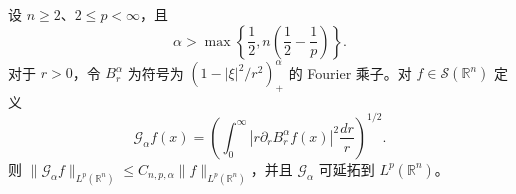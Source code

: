 设 $n\ge2$、$2\le p<\infty$，且
\[
\alpha>\max\left\{\frac12,n\left(\frac12-\frac1p\right)\right\}.
\]
对于 $r>0$，令 $B_r^\alpha$ 为符号为 $(1-|\xi|^2/r^2)_+^\alpha$ 的 Fourier 乘子。对 $f\in\mathcal S(\mathbb R^n)$ 定义
\[
\mathcal G_\alpha f(x)
 =\left(\int_0^\infty |r\partial_r B_r^\alpha f(x)|^2\frac{dr}{r}\right)^{1/2}.
\]
则 $\|\mathcal G_\alpha f\|_{L^p(\mathbb R^n)}\le C_{n,p,\alpha}\|f\|_{L^p(\mathbb R^n)}$，并且 $\mathcal G_\alpha$ 可延拓到 $L^p(\mathbb R^n)$。
